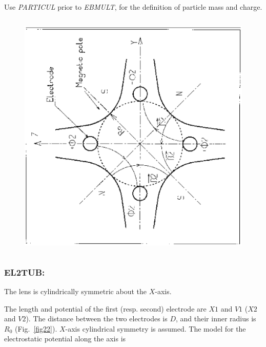 \noindent Use \textsl{PARTICUL} prior to \textsl{EBMULT}, for the 
 definition of  particle mass and charge.
\vfill

\begin{figure}[H]
\centerline{\includegraphics[height=12cm,angle=-90]{Fig20.ps}}
\end{figure}

\newpage

\subsubsection*{EL2TUB: \ELTwoTUBTitl} \label{EL2TUB} 
\medskip

The lens is cylindrically symmetric about the $ X $-axis. 

\noindent The length and potential of the first (resp. second) electrode 
are $ X1 $ and $ V1 $ ($ X2 $ and $ V2$).   The distance between the two 
electrodes is $ D$,   and their inner radius is $ R_0 $ (Fig.~\ref{fig22}).   
$X$-axis  cylindrical symmetry is assumed. The model for the electrostatic potential 
along the axis is~\cite{Biblio16}     %

